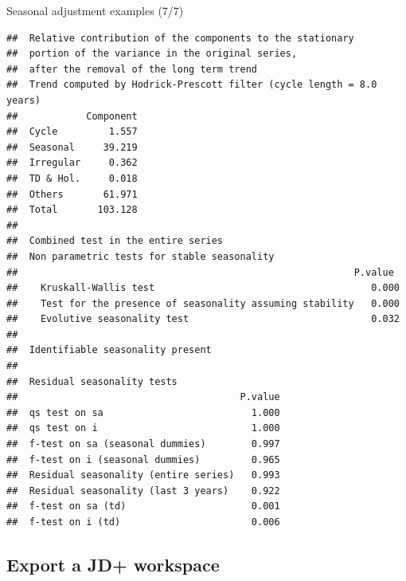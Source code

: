 \documentclass[10pt,xcolor=table,color={dvipsnames,usenames},ignorenonframetext,usepdftitle=false,french]{beamer}
\newenvironment{Shaded}{\begin{snugshade}}{\end{snugshade}}
\newcommand{\NormalTok}[1]{#1}
\newcommand{\OperatorTok}[1]{\textcolor[rgb]{0.81,0.36,0.00}{\textbf{#1}}}
\begin{document}
\begin{frame}[fragile]{Seasonal adjustment examples (7/7)}
\protect\hypertarget{seasonal-adjustment-examples-77}{}

\footnotesize

\begin{Shaded}
\end{Shaded}

\begin{verbatim}
##  Relative contribution of the components to the stationary
##  portion of the variance in the original series,
##  after the removal of the long term trend 
##  Trend computed by Hodrick-Prescott filter (cycle length = 8.0 years)
##            Component
##  Cycle         1.557
##  Seasonal     39.219
##  Irregular     0.362
##  TD & Hol.     0.018
##  Others       61.971
##  Total       103.128
## 
##  Combined test in the entire series 
##  Non parametric tests for stable seasonality
##                                                           P.value
##    Kruskall-Wallis test                                      0.000
##    Test for the presence of seasonality assuming stability   0.000
##    Evolutive seasonality test                                0.032
##  
##  Identifiable seasonality present
## 
##  Residual seasonality tests 
##                                       P.value
##  qs test on sa                          1.000
##  qs test on i                           1.000
##  f-test on sa (seasonal dummies)        0.997
##  f-test on i (seasonal dummies)         0.965
##  Residual seasonality (entire series)   0.993
##  Residual seasonality (last 3 years)    0.922
##  f-test on sa (td)                      0.001
##  f-test on i (td)                       0.006
\end{verbatim}

\end{frame}

\hypertarget{export-a-jd-workspace}{%
\subsection{Export a JD+ workspace}\label{export-a-jd-workspace}}
\end{document}
